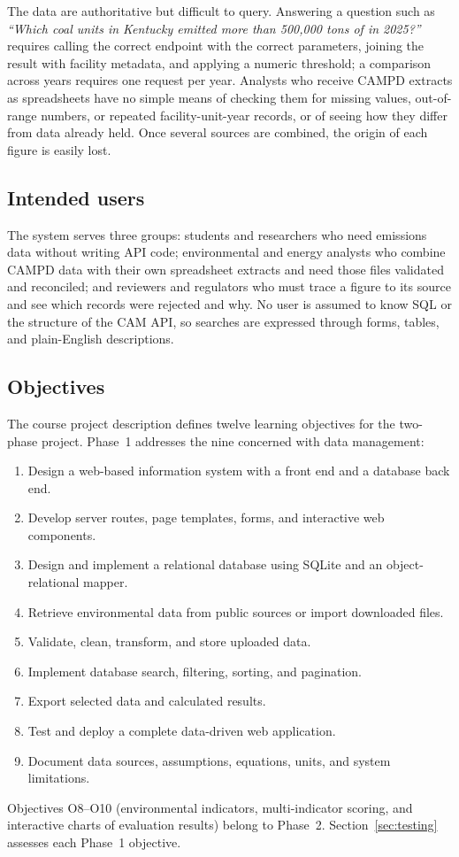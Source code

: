\documentclass[11pt,a4paper]{article}
\begin{document}
The data are authoritative but difficult to query. Answering a question such as \emph{``Which
coal units in Kentucky emitted more than 500{,}000 tons of \COtwo{} in 2025?''} requires calling
the correct endpoint with the correct parameters, joining the result with facility metadata,
and applying a numeric threshold; a comparison across years requires one request per year.
Analysts who receive CAMPD extracts as spreadsheets have no simple means of checking them for
missing values, out-of-range numbers, or repeated facility-unit-year records, or of seeing how
they differ from data already held. Once several sources are combined, the origin of each
figure is easily lost.

\subsection{Intended users}

The system serves three groups: students and researchers who need emissions data without
writing API code; environmental and energy analysts who combine CAMPD data with their own
spreadsheet extracts and need those files validated and reconciled; and reviewers and
regulators who must trace a figure to its source and see which records were rejected and why.
No user is assumed to know SQL or the structure of the CAM API, so searches are expressed
through forms, tables, and plain-English descriptions.

\subsection{Objectives}

The course project description defines twelve learning objectives for the two-phase project.
Phase~1 addresses the nine concerned with data management:
\begin{enumerate}[label=O\arabic*.]
  \item Design a web-based information system with a front end and a database back end.
  \item Develop server routes, page templates, forms, and interactive web components.
  \item Design and implement a relational database using SQLite and an object-relational mapper.
  \item Retrieve environmental data from public sources or import downloaded files.
  \item Validate, clean, transform, and store uploaded data.
  \item Implement database search, filtering, sorting, and pagination.
  \item Export selected data and calculated results.
  \item[O11.] Test and deploy a complete data-driven web application.
  \item[O12.] Document data sources, assumptions, equations, units, and system limitations.
\end{enumerate}
Objectives O8--O10 (environmental indicators, multi-indicator scoring, and interactive charts of
evaluation results) belong to Phase~2. Section~\ref{sec:testing} assesses each Phase~1
objective.
\end{document}
